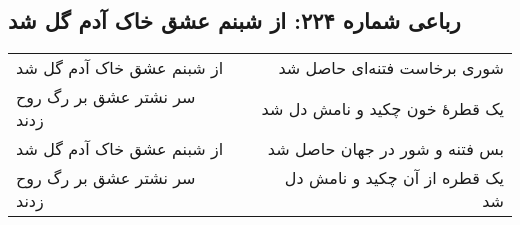 \begin{center}
\section*{رباعی شماره ۲۲۴: از شبنم عشق خاک آدم گل شد}
\label{sec:sh224}
\begin{longtable}{l p{0.5cm} r}
از شبنم عشق خاک آدم گل شد
&&
شوری برخاست فتنه‌ای حاصل شد
\\
سر نشتر عشق بر رگ روح زدند
&&
یک قطرهٔ خون چکید و نامش دل شد
\\
از شبنم عشق خاک آدم گل شد
&&
بس فتنه و شور در جهان حاصل شد
\\
سر نشتر عشق بر رگ روح زدند
&&
یک قطره از آن چکید و نامش دل شد
\\
\end{longtable}
\end{center}
